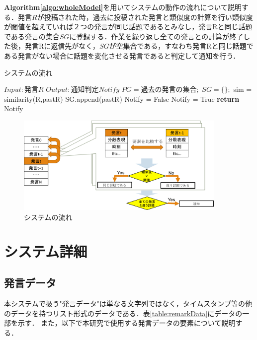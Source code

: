 \textbf{Algorithm\ref{algo:wholeModel}}を用いてシステムの動作の流れについて説明する．発言$R$が投稿された時，過去に投稿された発言と類似度の計算を行い類似度が閾値を超えていれば２つの発言が同じ話題であるとみなし，発言Rと同じ話題である発言の集合$SG$に登録する．作業を繰り返し全ての発言との計算が終了した後，発言Rに返信先がなく，$SG$が空集合である，すなわち発言Rと同じ話題である発言がない場合に話題を変化させる発言であると判定して通知を行う．
\begin{algorithm}
\caption{システムの流れ} \label{algo:wholeModel}
\begin{algorithmic}[1]
\State $Input:  発言R$
\State $Output: 通知判定Notify$
\State $PG = 過去の発言の集合;$%
	\State $SG = \{\};$%
	 \label{algo:wholeModel:for1-b}
	 	\State sim = similarity(R,pastR)
			\State SG.append(pastR)
		\EndIf
	 \EndFor\label{algo:wholeModel:for1-e}
	 \State Notify = False
		\State Notify = True
	\EndIf
	\State \textbf{return} Notify
\EndProcedure
\end{algorithmic}
\end{algorithm}
\begin{figure}[htbp]
 \begin{center}
  \includegraphics[width=0.9\textwidth]{../images/3.The_Model/WholeModel.png}
  \caption{システムの流れ}
  \label{Fig:wholeModel}
  \vspace{-10pt}
 \end{center}
\end{figure}

\section{システム詳細}
\label{model:detail}
\subsection{発言データ}
本システムで扱う"発言データ"は単なる文字列ではなく，タイムスタンプ等の他のデータを持つリスト形式のデータである．表\ref{table:remarkData}にデータの一部を示す．
また，以下で本研究で使用する発言データの要素について説明する．

